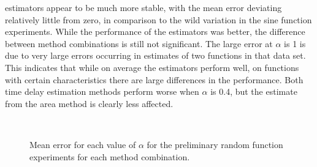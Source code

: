 \documentclass[a4paper,11pt]{article}
\begin{document}
estimators appear to be much more stable, with the mean error deviating
relatively little from zero, in comparison to the wild variation in the sine
function experiments. While the performance of the estimators was better, the
difference between method combinations is still not significant. The large error
at $\alpha$ is 1 is due to very large errors occurring in estimates of two
functions in that data set. This indicates that while on average the estimators
perform well, on functions with certain characteristics there are large
differences in the performance. Both time delay estimation methods perform worse
when $\alpha$ is 0.4, but the estimate from the area method is clearly less
affected.
\begin{center}
\begin{figure}
\\
\caption{Mean error for each value of $\alpha$ for the preliminary random
function experiments for each method combination.}
\label{fig:randerror}
\end{figure}
\end{center}
\end{document}
